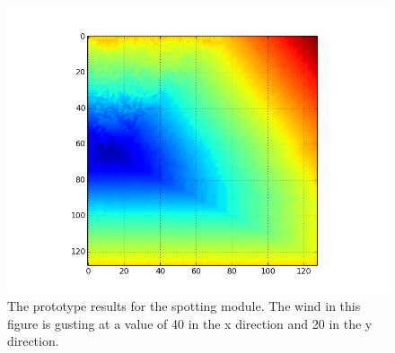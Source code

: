 \begin{figure}%
\centering
  \includegraphics[height=.38\textheight]{figures/results/spot_40_40.png}
  \caption{The prototype results for the spotting module. The wind in this figure is gusting at a value of 40 in the x direction and 20 in the y direction.}
  \label{fig:spot_40_20}
\end{figure} 

